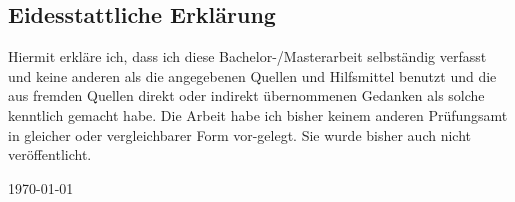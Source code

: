 \thispagestyle{empty}

\begin{otherlanguage}{ngerman}
\chapter*{Eidesstattliche Erklärung}

Hiermit erkläre ich, dass ich diese Bachelor-/Masterarbeit selbständig verfasst und keine anderen als die angegebenen Quellen und Hilfsmittel benutzt und die aus fremden Quellen direkt oder indirekt übernommenen Gedanken als solche kenntlich gemacht habe. Die Arbeit habe ich bisher keinem anderen Prüfungsamt in gleicher oder vergleichbarer Form vor-gelegt. Sie wurde bisher auch nicht veröffentlicht.


\today
\end{otherlanguage}


\clearpage






